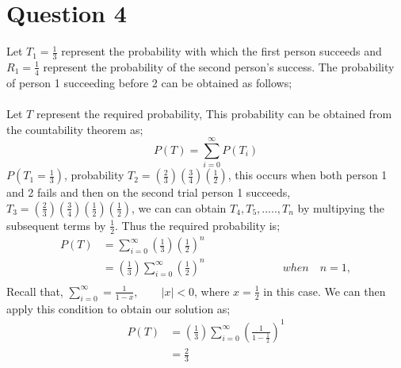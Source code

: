 \documentclass[12pt,a4paper]{article}
\begin{document}
\section*{Question 4}
Let $T_{1}=\frac{1}{3}$ represent the probability with which the first person succeeds and $R_{1}=\frac{1}{4}$ represent the probability of the second person's success. The probability of person 1 succeeding before 2 can be obtained as follows;\\
\\
Let $T$ represent the required probability, This probability  can be obtained from the countability theorem as;\\
$$P\left(T\right)=\sum _{i=0}^{\infty}P\left(T_{i}\right)$$
$P\left(T_{1}=\frac{1}{3}\right)$, probability $T_{2} =\left(\frac{2}{3}\right)\left(\frac{3}{4}\right)\left(\frac{1}{2}\right)$, this occurs when both person 1 and 2 fails and then on the second trial person 1 succeeds, $T_{3} =\left(\frac{2}{3}\right)\left(\frac{3}{4}\right)\left(\frac{1}{2}\right)\left(\frac{1}{2}\right)$, we can can obtain  $T_{4}, T_{5},.....,T_{n}$ by multipying the subsequent terms by $\frac{1}{2}$. Thus the required probability is;\\
\begin{align*}
P\left(T\right)&=\sum _{i=0} ^{\infty}\left(\frac{1}{3}\right)\left(\frac{1}{2}\right)^{n}\\
&=\left(\frac{1}{3}\right)\sum _{i=0} ^{\infty}\left(\frac{1}{2}\right)^{n} \quad  \quad\quad\quad\quad\quad\quad when  \quad n=1,\\
\end{align*}
Recall that, $\sum _{i=0}^{\infty}=\frac{1}{1-x}, \quad \quad|x|<0$, where $x=\frac{1}{2}$ in this case. We can then apply this condition to obtain our solution as;\\
\begin{align*}
P\left(T\right)&=\left(\frac{1}{3}\right)\sum _{i=0} ^{\infty}\left(\frac{1}{1-\frac{1}{2}}\right)^{1}\\
&=\frac{2}{3}
\end{align*}
\end{document}
